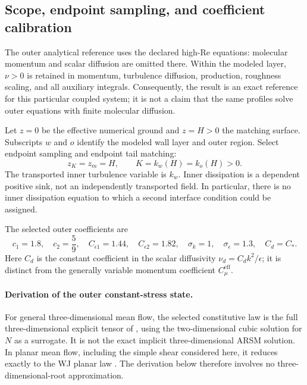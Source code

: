 \documentclass[11pt,a4paper]{article}
\numberwithin{equation}{section}
\begin{document}
\subsection{Scope, endpoint sampling, and coefficient calibration}
\label{ba:coefficients}

The outer analytical reference uses the declared high-Re equations: molecular
momentum and scalar diffusion are omitted there. Within the modeled layer,
$\nu>0$ is retained in momentum, turbulence diffusion, production, roughness
scaling, and all auxiliary integrals. Consequently, the result is an exact
reference for this particular coupled system; it is not a claim that the
same profiles solve outer equations with finite molecular diffusion.

Let $z=0$ be the effective numerical ground and $z=H>0$ the matching
surface. Subscripts $w$ and $o$ identify the modeled wall layer and outer
region. Select endpoint sampling and endpoint tail matching:
\begin{equation}
 \boxed{z_K=z_m=H,\qquad K=k_w(H)=k_o(H)>0.}
 \label{ba:sampling}
\end{equation}
The transported inner turbulence variable is $k_w$. Inner dissipation is
a dependent positive sink, not an independently transported field. In
particular, there is no inner dissipation equation to which a second
interface condition could be assigned.

The selected outer coefficients are
\begin{equation}
 c_1=1.8,\quad c_2=\frac59,\quad
 C_{\epsilon1}=1.44,\quad C_{\epsilon2}=1.82,\quad
 \sigma_k=1,\quad \sigma_\epsilon=1.3,\quad C_d=C_*.
 \label{ba:outer-coefficients}
\end{equation}
Here $C_d$ is the constant coefficient in the scalar diffusivity
$\nu_d=C_dk^2/\epsilon$; it is distinct from the generally variable
momentum coefficient $C_\mu^{\mathrm{eff}}$.

\paragraph{Derivation of the outer constant-stress state.}
For general three-dimensional mean flow, the selected constitutive law is
the full three-dimensional explicit tensor of
\cite[Eqs.~(15)--(18)]{Baungaard2022}, using the two-dimensional cubic
solution for $N$ as a surrogate. It is not the exact implicit
three-dimensional ARSM solution. In planar mean flow, including the
simple shear considered here, it reduces exactly to the WJ planar law
\cite{WJ2000,Baungaard2022}. The derivation below therefore involves no
three-dimensional-root approximation.
\end{document}

